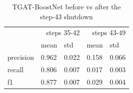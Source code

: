 \begin{table}
\caption{TGAT-BoostNet before vs after the step-43 shutdown}
\label{tab:02_before_after_step43}
\begin{tabular}{lllll}
\toprule
 & \multicolumn{2}{r}{steps 35-42} & \multicolumn{2}{r}{steps 43-49} \\
 & mean & std & mean & std \\
\midrule
precision & 0.962 & 0.022 & 0.158 & 0.066 \\
recall & 0.806 & 0.007 & 0.017 & 0.003 \\
f1 & 0.877 & 0.007 & 0.029 & 0.004 \\
\bottomrule
\end{tabular}
\end{table}
